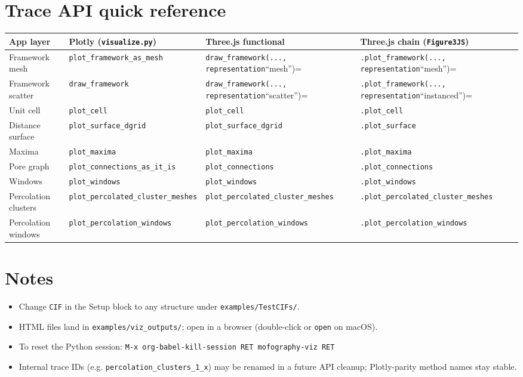 \documentclass[11pt]{article}
\begin{document}
\section{Trace API quick reference}
\label{sec:orgdb36d87}

\begin{center}
\begin{tabular}{llll}
App layer & Plotly (\texttt{visualize.py}) & Three.js functional & Three.js chain (\texttt{Figure3JS})\\
\hline
Framework mesh & \texttt{plot\_framework\_as\_mesh} & \texttt{draw\_framework(..., representation}``mesh'')= & \texttt{.plot\_framework(..., representation}``mesh'')=\\
Framework scatter & \texttt{draw\_framework} & \texttt{draw\_framework(..., representation}``scatter'')= & \texttt{.plot\_framework(..., representation}``instanced'')=\\
Unit cell & \texttt{plot\_cell} & \texttt{plot\_cell} & \texttt{.plot\_cell}\\
Distance surface & \texttt{plot\_surface\_dgrid} & \texttt{plot\_surface\_dgrid} & \texttt{.plot\_surface}\\
Maxima & \texttt{plot\_maxima} & \texttt{plot\_maxima} & \texttt{.plot\_maxima}\\
Pore graph & \texttt{plot\_connections\_as\_it\_is} & \texttt{plot\_connections} & \texttt{.plot\_connections}\\
Windows & \texttt{plot\_windows} & \texttt{plot\_windows} & \texttt{.plot\_windows}\\
Percolation clusters & \texttt{plot\_percolated\_cluster\_meshes} & \texttt{plot\_percolated\_cluster\_meshes} & \texttt{.plot\_percolated\_cluster\_meshes}\\
Percolation windows & \texttt{plot\_percolation\_windows} & \texttt{plot\_percolation\_windows} & \texttt{.plot\_percolation\_windows}\\
\end{tabular}
\end{center}
\section{Notes}
\label{sec:org4ede7ee}

\begin{itemize}
\item Change \texttt{CIF} in the Setup block to any structure under \texttt{examples/TestCIFs/}.
\item HTML files land in \texttt{examples/viz\_outputs/}; open in a browser (double-click or \texttt{open} on macOS).
\item To reset the Python session: \texttt{M-x org-babel-kill-session RET mofography-viz RET}
\item Internal trace IDs (e.g. \texttt{percolation\_clusters\_1\_x}) may be renamed in a future API cleanup; Plotly-parity method names stay stable.
\end{itemize}
\end{document}
